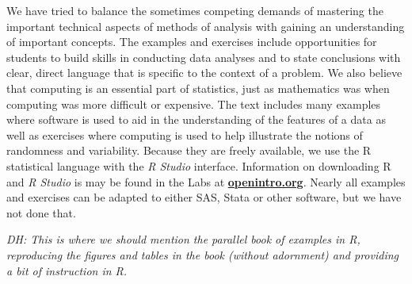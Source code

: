 We have tried to balance the sometimes competing demands of mastering the important technical aspects of methods of analysis with gaining an understanding of important concepts.  The examples and exercises include opportunities for students to build skills in conducting data analyses and to state conclusions with clear, direct language that is specific to the context of a problem.  We also believe that computing is an essential part of statistics, just as mathematics was when computing was more difficult or expensive.  The text includes many examples where software is used to aid in the understanding of the features of a data as well as exercises where computing is used to help illustrate the notions of randomness and variability. Because they are freely available, we use the \textsf{R} statistical language with the \textsl{R Studio} interface.  Information on downloading \textsf{R} and \textsl{R Studio} is may be found in the Labs at \href{http://www.openintro.org}{\color{black}\textbf{openintro.org}}.  Nearly all examples and exercises can be adapted to either SAS, Stata or other software, but we have not done that.

\textit{DH: This is where we should mention the parallel book of examples in R, reproducing the figures and tables in the book (without adornment) and providing a bit of instruction in R.}



\begin{comment}

This book may be downloaded as a free PDF at \href{http://www.openintro.org}{\color{black}\textbf{openintro.org}}. %
\vspace{3mm}

\noindent We hope readers will take away three ideas from this book in addition to forming a foundation of statistical thinking and methods.\vspace{-1mm}
\begin{enumerate}
\setlength{\itemsep}{0mm}
\item[(1)] Statistics is an applied field with a wide range of practical applications.
\item[(2)] You don't have to be a math guru to learn from real, interesting data.
\item[(3)] Data is messy, and statistical tools are imperfect. But, when you understand the strengths and weaknesses of these tools, you can use them to learn about the real~world.
\end{enumerate}

\end{comment}

